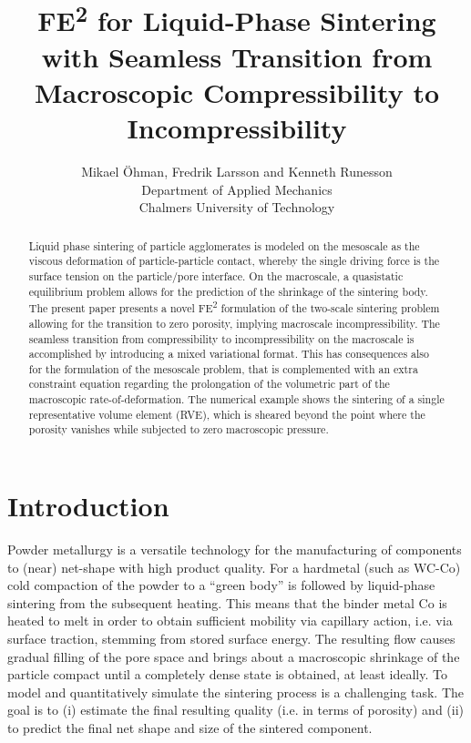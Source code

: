 \documentclass[12pt,a4paper,fleqn]{article}
\begin{document}
\title{FE\textsuperscript{2} for Liquid-Phase Sintering with Seamless Transition from Macroscopic Compressibility to Incompressibility}

\author{
Mikael Öhman, Fredrik Larsson and Kenneth Runesson\\
Department of Applied Mechanics \\
Chalmers University of Technology}

\maketitle

\begin{abstract}
\noindent
Liquid phase sintering of particle agglomerates is modeled on the mesoscale as the viscous deformation of particle-particle contact, whereby the single driving force is the surface tension on the particle/pore interface.
On the macroscale, a quasistatic equilibrium problem allows for the prediction of the shrinkage of the sintering body.
The present paper presents a novel FE\textsuperscript{2} formulation of the two-scale sintering problem allowing for the transition to zero porosity, implying macroscale incompressibility.
The seamless transition from compressibility to incompressibility on the macroscale is accomplished by introducing a mixed variational format.
This has consequences also for the formulation of the mesoscale problem, that is complemented with an extra constraint equation regarding the prolongation of the volumetric part of the macroscopic rate-of-deformation.
The numerical example shows the sintering of a single representative volume element (RVE), which is sheared beyond the point where the porosity vanishes while subjected to zero macroscopic pressure.
\end{abstract}

\section{Introduction}
Powder metallurgy is a versatile technology for the manufacturing of components to (near) net-shape with high product quality. For a hardmetal (such as WC-Co) cold compaction of the powder to a ``green body'' is followed by liquid-phase sintering from the subsequent heating.
This means that the binder metal Co is heated to melt in order to obtain sufficient mobility via capillary action, i.e. via surface traction, stemming from stored surface energy.
The resulting flow causes gradual filling of the pore space and brings about a macroscopic shrinkage of the particle compact until a completely dense state is obtained, at least ideally. To model and quantitatively simulate the sintering process is a challenging task.
The goal is to (i) estimate the final resulting quality (i.e. in terms of porosity) and (ii) to predict the final net shape and size of the sintered component.
\end{document}
